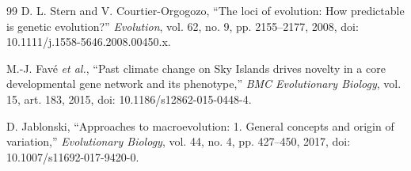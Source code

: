 \documentclass[conference]{IEEEtran}
\begin{document}
\begin{thebibliography}{99}
D. L. Stern and V. Courtier-Orgogozo, ``The loci of evolution: How predictable is genetic evolution?'' \emph{Evolution}, vol. 62, no. 9, pp. 2155--2177, 2008, doi: 10.1111/j.1558-5646.2008.00450.x.

M.-J. Favé \emph{et al.}, ``Past climate change on Sky Islands drives novelty in a core developmental gene network and its phenotype,'' \emph{BMC Evolutionary Biology}, vol. 15, art. 183, 2015, doi: 10.1186/s12862-015-0448-4.

D. Jablonski, ``Approaches to macroevolution: 1. General concepts and origin of variation,'' \emph{Evolutionary Biology}, vol. 44, no. 4, pp. 427--450, 2017, doi: 10.1007/s11692-017-9420-0.

\end{thebibliography}
\end{document}
